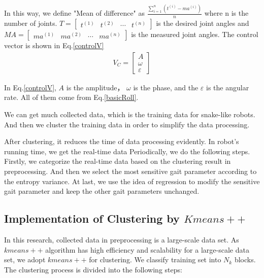 In this way, we define "Mean of difference" as $\frac{\sum_{i=1}^{n}(t^{(i)}-ma^{(i)})}{n} $ where n is the number of joints. $T=\begin{bmatrix}
t^{(1)} & t^{(2)} & \cdots & t^{(n)}
\end{bmatrix}$ is the desired joint angles and $MA=\begin{bmatrix}
ma^{(1)} & ma^{(2)} & \cdots & ma^{(n)}
\end{bmatrix}$ is the measured joint angles. The control vector is shown in Eq.\ref{controlV}
\begin{eqnarray}\label{controlV}
V_C=\begin{bmatrix}
A\\ 
\omega\\
\varepsilon
\end{bmatrix}
\end{eqnarray}

In Eq.\ref{controlV}, $A$ is the amplitude， $\omega$ is the phase, and the $\varepsilon$ is the angular rate. All of them come from Eq.\ref{basicRoll}.

We can get much collected data, which is the training data for snake-like robots. And then we cluster the training data in order to simplify the data processing.

After clustering, it reduces the time of data processing evidently. In robot's running time, we get the real-time data Periodically, we do the following steps. Firstly, we categorize the real-time data based on the clustering result in preprocessing. And then we select the most sensitive gait parameter according to the entropy variance. At last, we use the idea of regression to modify the sensitive gait parameter and keep the other gait parameters unchanged.

\subsection{Implementation of Clustering by $Kmeans++$}
In this research, collected data in preprocessing is a large-scale data set. As $kmeans++$ algorithm has high efficiency and scalability for a large-scale data set, we adopt $kmeans++$ for clustering. We classify training set into $N_{k}$ blocks. The clustering process is divided into the following steps:


